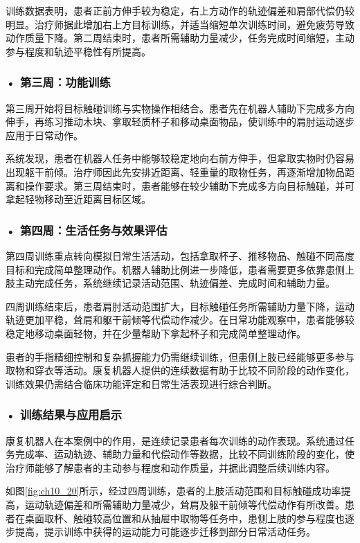 训练数据表明，患者正前方伸手较为稳定，右上方动作的轨迹偏差和肩部代偿仍较明显。治疗师据此增加右上方目标训练，并适当缩短单次训练时间，避免疲劳导致动作质量下降。第二周结束时，患者所需辅助力量减少，任务完成时间缩短，主动参与程度和轨迹平稳性有所提高。

\subsubsection*{\textbf{• 第三周：功能训练}}

第三周开始将目标触碰训练与实物操作相结合。患者先在机器人辅助下完成多方向伸手，再练习推动木块、拿取轻质杯子和移动桌面物品，使训练中的肩肘运动逐步应用于日常动作。

系统发现，患者在机器人任务中能够较稳定地向右前方伸手，但拿取实物时仍容易出现躯干前倾。治疗师因此先安排近距离、轻重量的取物任务，再逐渐增加物品距离和操作要求。第三周结束时，患者能够在较少辅助下完成多方向目标触碰，并可拿起轻物移动至近距离目标区域。

\subsubsection*{\textbf{• 第四周：生活任务与效果评估}}

第四周训练重点转向模拟日常生活活动，包括拿取杯子、推移物品、触碰不同高度目标和完成简单整理动作。机器人辅助比例进一步降低，患者需要更多依靠患侧上肢主动完成任务，系统继续记录活动范围、轨迹偏差、完成时间和辅助力量。

四周训练结束后，患者肩肘活动范围扩大，目标触碰任务所需辅助力量下降，运动轨迹更加平稳，耸肩和躯干前倾等代偿动作减少。在日常功能观察中，患者能够较稳定地移动桌面轻物，并在少量帮助下拿起杯子和完成简单整理动作。

患者的手指精细控制和复杂抓握能力仍需继续训练，但患侧上肢已经能够更多参与取物和穿衣等活动。康复机器人提供的连续数据有助于比较不同阶段的动作变化，训练效果仍需结合临床功能评定和日常生活表现进行综合判断。

\subsubsection*{\textbf{• 训练结果与应用启示}}

康复机器人在本案例中的作用，是连续记录患者每次训练的动作表现。系统通过任务完成率、运动轨迹、辅助力量和代偿动作等数据，比较不同训练阶段的变化，使治疗师能够了解患者的主动参与程度和动作质量，并据此调整后续训练内容。

如图\ref{fig:ch10_20}所示，经过四周训练，患者的上肢活动范围和目标触碰成功率提高，运动轨迹偏差和所需辅助力量减少，耸肩及躯干前倾等代偿动作有所改善。患者在桌面取杯、触碰较高位置和从抽屉中取物等任务中，患侧上肢的参与程度也逐步提高，提示训练中获得的运动能力可能逐步迁移到部分日常活动任务。

